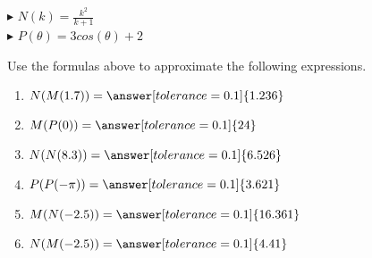 \documentclass{ximera}
\begin{document}
$\blacktriangleright$ $N(k) = \frac{k^2}{k + 1}$ \\

$\blacktriangleright$ $P(\theta) = 3 cos(\theta) + 2$










\begin{question}


Use the formulas above to approximate the following expressions.



\begin{enumerate}

\item $N(M(1.7)) = \answer[tolerance=0.1]{1.236}$ \\

\item $M(P(0)) = \answer[tolerance=0.1]{24}$ \\

\item $N(N(8.3)) = \answer[tolerance=0.1]{6.526}$ \\

\item $P(P(-\pi)) = \answer[tolerance=0.1]{3.621}$ \\

\item $M(N(-2.5)) = \answer[tolerance=0.1]{16.361}$ \\

\item $N(M(-2.5)) = \answer[tolerance=0.1]{4.41}$ \\

\end{enumerate}



\end{question}
\end{document}
